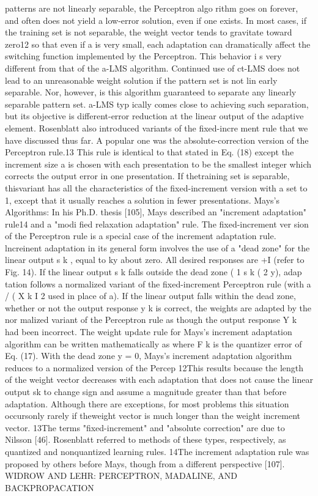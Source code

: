 \documentclass[11pt,a4paper,twocolumn]{article}
\begin{document}
patterns are not linearly separable, the Perceptron algo
rithm goes on forever, and often does not yield a low-error 
solution, even if one exists. In most cases, if the training set 
is not separable, the weight vector tends to gravitate toward 
zero12 so that even if a is very small, each adaptation can 
dramatically affect the switching function implemented by 
the Perceptron. 
This behavior i s  very different from that of the a-LMS 
algorithm. Continued use of ct-LMS does not lead to an 
unreasonable weight solution if the pattern set is not lin
early separable. Nor, however, is this algorithm guaranteed 
to separate any linearly separable pattern set. a-LMS typ
ically comes close to achieving such separation, but its 
objective is different-error reduction at the linear output 
of the adaptive element. 
Rosenblatt also introduced variants of the fixed-incre
ment rule that we have discussed thus far. A popular one 
was the absolute-correction version of the Perceptron 
rule.13 This rule is identical to that stated in Eq. (18) except 
the increment size a is chosen with each presentation to 
be the smallest integer which corrects the output error in 
one presentation. If thetraining set is separable, thisvariant 
has all the characteristics of the fixed-increment version 
with a set to 1, except that it usually reaches a solution in 
fewer presentations. 
Mays's Algorithms: In his Ph.D. thesis [105], Mays 
described an "increment adaptation" rule14 and a "modi
fied relaxation adaptation" rule. The fixed-increment ver
sion of the Perceptron rule is a special case of the increment 
adaptation rule. 
lncreinent adaptation in its general form involves the use 
of a "dead zone" for the linear output s k ,  equal to ky about 
zero. All desired responses are +I (refer to Fig. 14). If the 
linear output s k  falls outside the dead zone ( 1 s k (  2 y), adap
tation follows a normalized variant of the fixed-increment 
Perceptron rule (with a / ( X k I 2  used in place of a). If the linear 
output falls within the dead zone, whether or not the output 
response y k  is correct, the weights are adapted by the nor
malized variant of the Perceptron rule as though the output 
response Y k  had been incorrect. The weight update rule for 
Mays's increment adaptation algorithm can be written 
mathematically as 
where F k  is the quantizer error of Eq. (17). 
With the dead zone y = 0, Mays's increment adaptation 
algorithm reduces to a normalized version of the Percep
12This results because the length of the weight vector decreases 
with each adaptation that does not cause the linear output sk to 
change sign and assume a magnitude greater than that before 
adaptation. Although there are exceptions, for most problems this 
situation occursonly rarely if theweight vector is much longer than 
the weight increment vector. 
13The terms "fixed-increment" and "absolute correction" are due 
to Nilsson [46]. Rosenblatt referred to methods of these types, 
respectively, as quantized and nonquantized learning rules. 
14The increment adaptation rule was proposed by others before 
Mays, though from a different perspective [107]. 
WIDROW AND LEHR: PERCEPTRON, MADALINE, AND BACKPROPACATION 
\end{document}
